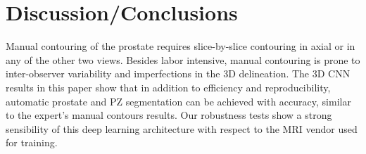 \section{Discussion/Conclusions}
\label{sec:disc}
Manual contouring of the prostate requires slice-by-slice contouring in axial or in any of the other two views. Besides labor intensive, manual contouring is prone to inter-observer variability and imperfections in the 3D delineation. The 3D CNN results in this paper show that in addition to efficiency and reproducibility, automatic prostate and PZ segmentation can be achieved with accuracy, similar to the expert's manual contours results. Our robustness tests show a strong sensibility of this deep learning architecture with respect to the MRI vendor used for training. 


